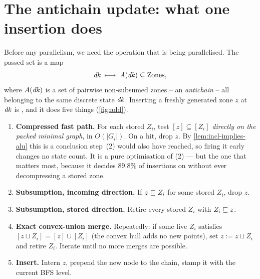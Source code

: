 \section{The antichain update: what one insertion does}
\label{sec:antichain}

Before any parallelism, we need the operation that is being parallelised.  The
passed set is a map
\[
  \mathit{dk} \;\longmapsto\; A(\mathit{dk}) \subseteq \text{Zones},
\]
where $A(\mathit{dk})$ is a set of pairwise non-subsumed zones -- an \emph{antichain}
-- all belonging to the same discrete state $\mathit{dk}$.  Inserting a freshly
generated zone $z$ at $\mathit{dk}$ is , and it does five things
(\cref{fig:add}).

\FigAdd

\begin{enumerate}[leftmargin=1.9em, itemsep=3pt]
\item[\textbf{(1)}] \textbf{Compressed fast path.}  For each stored $Z_i$, test
      $[z] \subseteq [Z_i]$ \emph{directly on the packed minimal graph}, in
      $O(|G_i|)$.  On a hit, drop $z$.  By \cref{lem:incl-implies-alu} this is
      a conclusion step~(2) would also have reached, so firing it early changes
      no state count.  It is a pure optimisation of (2) --- but the one that
      matters most, because it decides $89.8\%$ of insertions on
       without ever decompressing a stored zone.

\item[\textbf{(2)}] \textbf{Subsumption, incoming direction.}  If
      $z \sqsubseteq Z_i$ for some stored $Z_i$, drop $z$.

\item[\textbf{(3)}] \textbf{Subsumption, stored direction.}  Retire every
      stored $Z_i$ with $Z_i \sqsubseteq z$.

\item[\textbf{(4)}] \textbf{Exact convex-union merge.}  Repeatedly: if some
      live $Z_i$ satisfies $[z \sqcup Z_i] = [z] \cup [Z_i]$ (the convex hull
      adds no new points), set $z := z \sqcup Z_i$ and retire $Z_i$.  Iterate
      until no more merges are possible.

\item[\textbf{(5)}] \textbf{Insert.}  Intern $z$, prepend the new node to the
      chain, stamp it with the current BFS level.
\end{enumerate}

